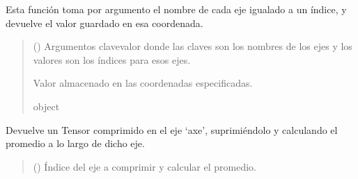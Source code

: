 \documentclass[letterpaper,10pt,english]{sphinxmanual}
\begin{document}
\begin{fulllineitems}
\begin{fulllineitems}
\begin{quote}
\begin{description}
\end{description}\end{quote}

\end{fulllineitems}


\begin{fulllineitems}
\label{\detokenize{utils.tensor:utils.tensor.Tensor.item}}
\pysigstartsignatures
{}
\pysigstopsignatures
\sphinxAtStartPar
Esta función toma por argumento el nombre de cada eje igualado a un
índice, y devuelve el valor guardado en esa coordenada.
\begin{quote}\begin{description}
\sphinxAtStartPar
{} () \textendash{} Argumentos clave\sphinxhyphen{}valor donde las claves son los nombres de los ejes y
los valores son los índices para esos ejes.

\sphinxAtStartPar
Valor almacenado en las coordenadas especificadas.

\sphinxAtStartPar
object

\end{description}\end{quote}

\end{fulllineitems}


\begin{fulllineitems}
\label{\detokenize{utils.tensor:utils.tensor.Tensor.mean}}
\pysigstartsignatures
{}
\pysigstopsignatures
\sphinxAtStartPar
Devuelve un Tensor comprimido en el eje ‘axe’, suprimiéndolo y calculando el promedio a lo largo de dicho eje.
\begin{quote}\begin{description}
\sphinxAtStartPar
{} () \textendash{} Índice del eje a comprimir y calcular el promedio.


\end{description}
\end{quote}
\end{fulllineitems}
\end{fulllineitems}
\end{document}
